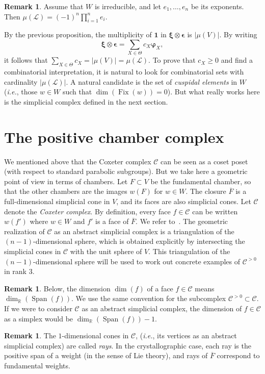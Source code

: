 \documentclass[11pt]{article}
\theoremstyle{definition}
\newtheorem{rema}[theo]{Remark}
\DeclareMathOperator{\Span}{Span}
\DeclareMathOperator{\Fix}{Fix}
\newcommand{\bphi}{\boldsymbol{\varphi}}
\newcommand{\bxi}{\boldsymbol{\xi}}
\newcommand{\bepsilon}{\boldsymbol{\epsilon}}
\newcommand{\triv}{\mathbf{1}}
\newcommand{\LL}{\mathcal{L}}
\newcommand{\CC}{\mathcal{C}}
\newcommand{\CCP}{\mathcal{C}^{>0}}
\begin{document}
\begin{rema}
    Assume that $W$ is irreducible, and let $e_1,\dots,e_n$ be its exponents.  Then $\mu(\LL) = (-1)^n \prod_{i=1}^n e_i$.  
\end{rema}

By the previous proposition, the multiplicity of $\triv$ in $\bxi\otimes\bepsilon$ is $|\mu(V)|$.  By writing
\[
    \bxi\otimes\bepsilon
        =
    \sum_{X\in \Theta} c_X \bphi_X,
\]
it follows that $\sum_{X\in\Theta} c_X = |\mu(V)| = \mu(\LL)$.  To prove that $c_X \geq 0$ and find a combinatorial interpretation, it is natural to look for combinatorial sets with cardinality $|\mu(\LL)|$.  A natural candidate is the set of {\it cuspidal elements} in $W$ ({\it i.e.}, those $w\in W$ such that $\dim(\Fix(w))=0$).  But what really works here is the simplicial complex defined in the next section.

\section{The positive chamber complex}
\label{sec:poschambercomp}

We mentioned above that the Coxeter complex $\CC$ can be seen as a coset poset (with respect to standard parabolic subgroups).  But we take here a geometric point of view in terms of chambers.  Let $F \subset V$ be the fundamental chamber, so that the other chambers are the images $w(F)$ for $w\in W$.  The closure $\overline{F}$ is a full-dimensional simplicial cone in $V$, and its faces are also simplicial cones.   Let $\CC$ denote the {\it Coxeter complex}.  By definition, every face $f\in \CC$ can be written $w(f')$ where $w\in W$ and $f'$ is a face of $\overline{F}$.  We refer to~\cite{bjornerbrenti}.  The geometric realization of $\CC$ as an abstract simplicial complex is a triangulation of the $(n-1)$-dimensional sphere, which is obtained explicitly by intersecting the simplicial cones in $\CC$ with the unit sphere of $V$.  This triangulation of the $(n-1)$-dimensional sphere will be used to work out concrete examples of $\CCP$ in rank 3.


 

\begin{rema} 
    Below, the dimension $\dim(f)$ of a face $f\in \CC$ means $\dim_{\mathbb{R}}(\Span(f))$.   We use the same convention  for the subcomplex $\CCP \subset \CC$.  If we were to consider $\CC$ as an abstract simplicial complex, the dimension of $f\in\CC$ as a simplex would be $\dim_{\mathbb{R}}(\Span(f))-1$.
\end{rema}
\begin{rema}
    The $1$-dimensional cones in $\CC$, ({\it i.e.}, its vertices as an abstract simplicial complex) are called {\it rays}.  In the crystallographic case, each ray is the positive span of a weight (in the sense of Lie theory), and rays of $\overline{F}$ correspond to fundamental weights.  
\end{rema}
\end{document}
